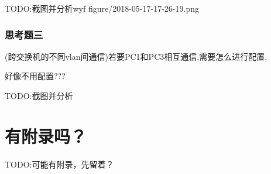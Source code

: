 \documentclass{myreport}
\begin{document}
TODO:截图并分析wyf
figure/2018-05-17-17-26-19.png

\subsection{思考题三}

\begin{tcolorbox}[title = {思考题三}]
(跨交换机的不同vlan间通信)若要PC1和PC3相互通信,需要怎么进行配置.
\end{tcolorbox}

好像不用配置???

TODO:截图并分析


% 
% 

\appendix

\chapter{有附录吗？}

TODO:可能有附录，先留着？

\cleardoublepage
\end{document}
